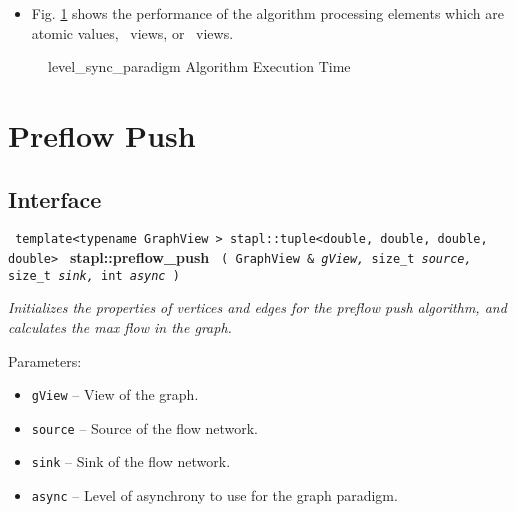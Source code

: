 \begin{itemize}
\item
Fig. \ref{fig:level-sync-alg-exec-exper}
shows the performance of the algorithm processing
elements which are atomic values, \stl\ views, or \stapl\ views.
\end{itemize}

\begin{figure}[p]
\caption{ level\_sync\_paradigm Algorithm Execution Time}
\label{fig:level-sync-alg-exec-exper}
\end{figure}


\section{ Preflow Push}
\label{sec-preflow-push-alg}

\subsection{Interface} \label{sec-preflow-push-alg-inter}

\noindent
\texttt{%
template<typename GraphView >
\newline
stapl::tuple<double, double, double, double> 
}
\newline
\textbf{stapl::preflow\_push}%
\newline
\texttt{%
(
GraphView \&
\textit{gView,}%
size\_t
\textit{source,}%
size\_t
\textit{sink,}%
int
\textit{async}%
)     
}
\vspace{0.4cm}

\textit{
Initializes the properties of vertices and edges for the preflow push algorithm, and calculates the max flow in the graph.
}
\vspace{0.4cm}

Parameters:
\begin{itemize}
\item
\texttt{gView} --
View of the graph.
\item
\texttt{source} --
Source of the flow network.
\item
\texttt{sink} --
Sink of the flow network.
\item
\texttt{async} --
Level of asynchrony to use for the graph paradigm.
\end{itemize}

